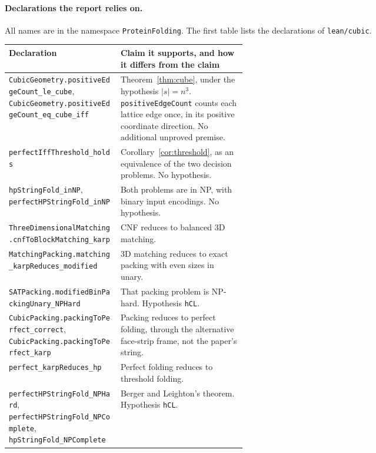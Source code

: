 \documentclass[11pt,letterpaper]{article}
\theoremstyle{definition}
\theoremstyle{remark}
\newcommand{\lean}[1]{\texttt{#1}}
\begin{document}
\paragraph{Declarations the report relies on.}
All names are in the namespace \lean{ProteinFolding}. The first table lists the declarations of
\lean{lean/cubic}.
\begin{center}\footnotesize
\begin{tabularx}{\linewidth}{@{}>{\raggedright\arraybackslash}p{0.47\linewidth}>{\raggedright\arraybackslash}X@{}}
\toprule
Declaration & Claim it supports, and how it differs from the claim\\
\midrule
\lean{CubicGeometry.\allowbreak positiveEdgeCount\_le\_cube},\newline
  \lean{CubicGeometry.\allowbreak positiveEdgeCount\_eq\_cube\_iff}
  & Theorem~\ref{thm:cube}, under the hypothesis $|s|=n^3$. \lean{positiveEdgeCount} counts each
  lattice edge once, in its positive coordinate direction. No additional unproved premise.\\
\lean{perfectIffThreshold\_holds} & Corollary~\ref{cor:threshold}, as an equivalence of the two
  decision problems. No hypothesis.\\
\lean{hpStringFold\_inNP}, \lean{perfectHPStringFold\_inNP} & Both problems are in NP, with binary
  input encodings. No hypothesis.\\
\lean{ThreeDimensionalMatching.\allowbreak cnfToBlockMatching\_karp} & CNF reduces to balanced 3D matching.\\
\lean{MatchingPacking.matching\_karpReduces\_modified} & 3D matching reduces to exact packing with
  even sizes in unary.\\
\lean{SATPacking.modifiedBinPackingUnary\_NPHard} & That packing problem is NP-hard. Hypothesis
  \lean{hCL}.\\
\lean{CubicPacking.packingToPerfect\_correct}, \lean{CubicPacking.packingToPerfect\_karp} & Packing
  reduces to perfect folding, through the alternative face-strip frame, not the paper's string.\\
\lean{perfect\_karpReduces\_hp} & Perfect folding reduces to threshold folding.\\
\lean{perfectHPStringFold\_NPHard}, \lean{perfectHPStringFold\_NPComplete},
  \lean{hpStringFold\_NPComplete} & Berger and Leighton's theorem. Hypothesis \lean{hCL}.\\
\bottomrule
\end{tabularx}
\end{center}
\end{document}
